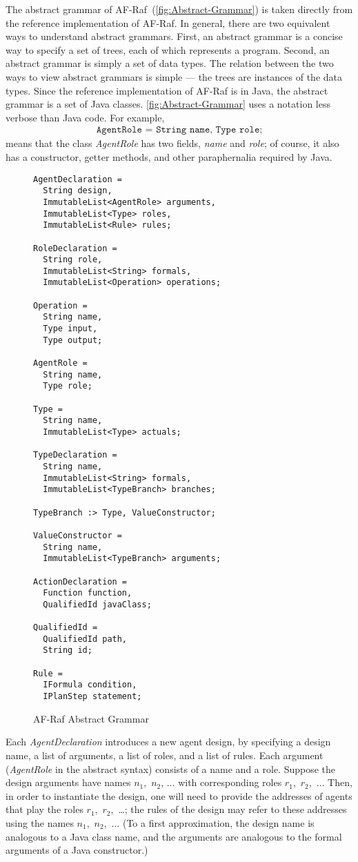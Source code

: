 \documentclass[a4paper,12pt,oneside,fleqn]{book} %
\begin{document}
The abstract grammar of AF-Raf~(\autoref{fig:Abstract-Grammar}) is taken
directly from the reference implementation of AF-Raf.  In general, there
are two equivalent ways to understand abstract grammars. First, an abstract
grammar is a concise way to specify a set of trees, each of which
represents a program. Second, an abstract grammar is simply a set of data
types. The relation between the two ways to view abstract grammars is
simple --- the trees are instances of the data types. Since the reference
implementation of AF-Raf is in Java, the abstract grammar is a set of Java
classes. \autoref{fig:Abstract-Grammar} uses a notation less verbose than
Java code. For example,
\begin{align}
\texttt{AgentRole = String name, Type role;}
\end{align}
means that the class {\it AgentRole\/} has two fields, {\it name\/} and
{\it role}; of course, it also has a constructor, getter methods, and other
paraphernalia required by Java.

\begin{figure}\footnotesize %
\begin{verbatim}
AgentDeclaration =
  String design,
  ImmutableList<AgentRole> arguments,
  ImmutableList<Type> roles,
  ImmutableList<Rule> rules;

RoleDeclaration =
  String role,
  ImmutableList<String> formals,
  ImmutableList<Operation> operations;

Operation =
  String name,
  Type input,
  Type output;

AgentRole =
  String name,
  Type role;

Type =
  String name,
  ImmutableList<Type> actuals;

TypeDeclaration =
  String name,
  ImmutableList<String> formals,
  ImmutableList<TypeBranch> branches;

TypeBranch :> Type, ValueConstructor;

ValueConstructor =
  String name,
  ImmutableList<TypeBranch> arguments;

ActionDeclaration =
  Function function,
  QualifiedId javaClass;

QualifiedId =
  QualifiedId path,
  String id;

Rule =
  IFormula condition,
  IPlanStep statement;
\end{verbatim}
\caption{AF-Raf Abstract Grammar}
\label{fig:Abstract-Grammar}
\end{figure}

Each {\it AgentDeclaration\/} introduces a new agent design, by specifying
a design name, a list of arguments, a list of roles, and a list of rules.
Each argument ({\it AgentRole\/} in the abstract syntax) consists of a name
and a role. Suppose the design arguments have names $n_1$,~$n_2$, $\ldots$
with corresponding roles $r_1$,~$r_2$,~$\ldots$ Then, in order to
instantiate the design, one will need to provide the addresses of agents
that play the roles $r_1$,~$r_2$,~\dots; the rules of the design may refer
to these addresses using the names $n_1$,~$n_2$,~$\ldots$ (To a first
approximation, the design name is analogous to a Java class name, and the
arguments are analogous to the formal arguments of a Java constructor.)
\end{document}
